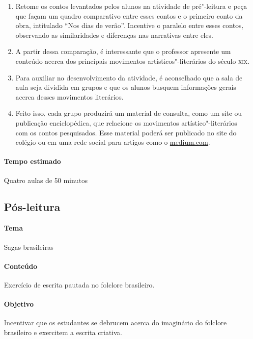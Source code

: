 \documentclass[12pt]{extarticle}
\begin{document}
\begin{enumerate}

\item  Retome os contos levantados pelos alunos na atividade de pré"-leitura e peça que
façam um quadro comparativo entre esses contos e o primeiro conto da obra,
intitulado ``Nos dias de verão''. Incentive o
paralelo entre esses contos, observando as
similaridades e diferenças nas narrativas entre eles.

\item A partir dessa comparação, é interessante que o professor apresente um conteúdo
acerca dos principais movimentos artísticos"-literários do século \textsc{xix}.

\item Para auxiliar no desenvolvimento da
atividade, é aconselhado que a sala de aula seja dividida em grupos e
que os alunos busquem informações gerais acerca desses movimentos literários.

\item Feito
isso, cada grupo produzirá um material de consulta, como um site ou publicação
enciclopédica, que relacione os movimentos artístico"-literários
com os contos pesquisados. Esse material poderá ser publicado no site do colégio ou 
em uma rede social para artigos como o \url{medium.com}.
\end{enumerate}

\paragraph{Tempo estimado} Quatro aulas de 50 minutos

\subsection{Pós-leitura}

\paragraph{Tema} Sagas brasileiras

\paragraph{Conteúdo} Exercício de escrita pautada no folclore brasileiro. 

\paragraph{Objetivo} Incentivar que os estudantes se debrucem acerca do imaginário
do folclore brasileiro e exercitem a escrita criativa.
\end{document}
